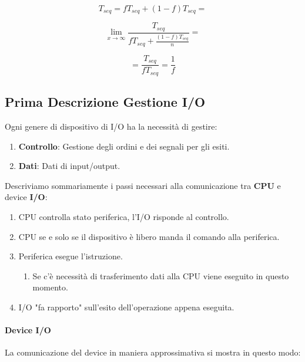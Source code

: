 \documentclass{article}
\begin{document}
\[ T_{seq} = fT_{seq} + (1-f)T_{seq} =\]

\[ \lim_{x\xrightarrow{}\infty} \frac{T_{seq}}{fT_{seq} + \frac{(1-f)T_{seq}}{n}} = \]

\vspace*{5px}

\[ = \frac{T_{seq}}{fT_{seq}} = \frac{1}{f} \]

\vspace*{5px}

\subsection{Prima Descrizione Gestione I/O}

Ogni genere di dispositivo di I/O ha la necessità di gestire:

\begin{enumerate}
    \item \textbf{Controllo}: Gestione degli ordini e dei segnali per gli esiti.
    \item \textbf{Dati}: Dati di input/output.
\end{enumerate}

Descriviamo sommariamente i passi necessari alla comunicazione tra \textbf{CPU} e device \textbf{I/O}:

\begin{enumerate}
    \item CPU controlla stato periferica, l'I/O risponde al controllo.
    \item CPU se e solo se il dispositivo è libero manda il comando alla periferica.
    \item Periferica esegue l'istruzione.
    \newpage
    \begin{enumerate}
        \item Se c'è necessità di trasferimento dati alla CPU viene eseguito in questo momento.
    \end{enumerate}
    \item I/O "fa rapporto" sull'esito dell'operazione appena eseguita.
\end{enumerate}

\vspace*{10px}

\paragraph{Device I/O} La comunicazione del device in maniera approssimativa si mostra in questo modo:
\end{document}
